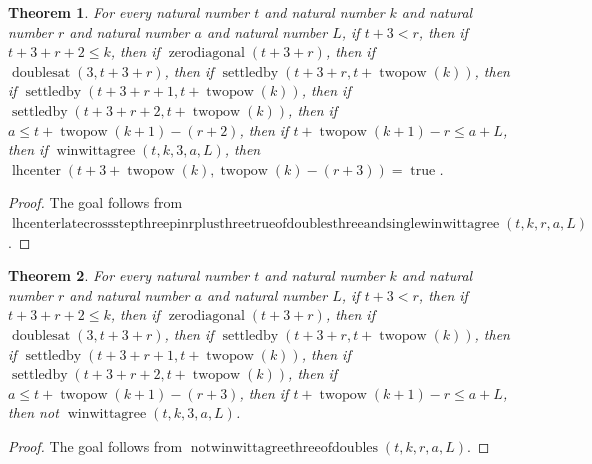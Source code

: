 \documentclass[11pt]{article}
\newtheorem{theorem}{Theorem}[section]
\theoremstyle{definition}
\begin{document}
\begin{theorem}
\label{ll:paper:lhcenter-late-cross-step-three-pin-r-plus-three-true-of-doubles-three-and-single-winwittagree}
For every natural number \(t\) and natural number \(k\) and natural number \(r\) and natural number \(a\) and natural number \(L\), if \(t + 3 < r\), then if \(t + 3 + r + 2 \le k\), then if \(\operatorname{zerodiagonal}(t + 3 + r)\), then if \(\operatorname{doublesat}(3, t + 3 + r)\), then if \(\operatorname{settledby}(t + 3 + r, t + \operatorname{twopow}(k))\), then if \(\operatorname{settledby}(t + 3 + r + 1, t + \operatorname{twopow}(k))\), then if \(\operatorname{settledby}(t + 3 + r + 2, t + \operatorname{twopow}(k))\), then if \(a \le t + \operatorname{twopow}(k + 1) - (r + 2)\), then if \(t + \operatorname{twopow}(k + 1) - r \le a + L\), then if \(\operatorname{winwittagree}(t, k, 3, a, L)\), then \(\operatorname{lhcenter}(t + 3 + \operatorname{twopow}(k), \operatorname{twopow}(k) - (r + 3)) = \operatorname{true}\).
\end{theorem}
\begin{proof}
The goal follows from \(\operatorname{lhcenterlatecrossstepthreepinrplusthreetrueofdoublesthreeandsinglewinwittagree}(t, k, r, a, L)\).
\end{proof}
\begin{theorem}
\label{ll:paper:not-winwittagree-three-of-doubles}
For every natural number \(t\) and natural number \(k\) and natural number \(r\) and natural number \(a\) and natural number \(L\), if \(t + 3 < r\), then if \(t + 3 + r + 2 \le k\), then if \(\operatorname{zerodiagonal}(t + 3 + r)\), then if \(\operatorname{doublesat}(3, t + 3 + r)\), then if \(\operatorname{settledby}(t + 3 + r, t + \operatorname{twopow}(k))\), then if \(\operatorname{settledby}(t + 3 + r + 1, t + \operatorname{twopow}(k))\), then if \(\operatorname{settledby}(t + 3 + r + 2, t + \operatorname{twopow}(k))\), then if \(a \le t + \operatorname{twopow}(k + 1) - (r + 3)\), then if \(t + \operatorname{twopow}(k + 1) - r \le a + L\), then not \(\operatorname{winwittagree}(t, k, 3, a, L)\).
\end{theorem}
\begin{proof}
The goal follows from \(\operatorname{notwinwittagreethreeofdoubles}(t, k, r, a, L)\).
\end{proof}
\end{document}
